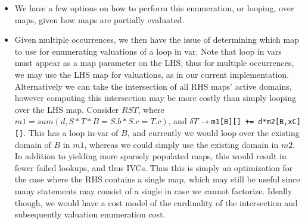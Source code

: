 \begin{itemize}
  \item We have a few options on how to perform this enumeration, or looping,
  over maps, given how maps are partially evaluated. 

  \item Given multiple occurrences, we then have the issue of determining which
  map to use for enumerating valuations of a loop in var. Note that loop in vars
  must appear as a map parameter on the LHS, thus for multiple occurrences, we
  may use the LHS map for valuations, as in our current implementation.
  Alternatively we can take the intersection of all RHS maps' active domains,
  however computing this intersection may be more costly than simply looping over
  the LHS map. Consider $RST$, where $m1=sum(d, S * T * B=S.b * S.c=T.c)$, and
  $\delta T \rightarrow $\texttt{m1[B][] += d*m2[B,xC][]}. This has a loop in-var
  of $B$, and currently we would loop over the existing domain of $B$ in $m1$,
  whereas we could simply use the existing domain in $m2$. In addition to
  yielding more sparsely populated maps, this would result in fewer failed
  lookups, and thus IVCs. Thus this is simply an optimization for the case where
  the RHS contains a single map, which may still be useful since many statements
  may consist of a single in case we cannot factorize. Ideally though, we would
  have a cost model of the cardinality of the intersection and subsequently
  valuation enumeration cost.
  

\end{itemize}
